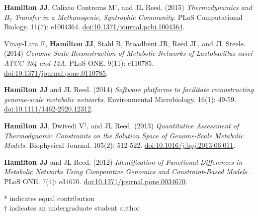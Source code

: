 \documentclass[letterpaper,11pt]{article}
\newlength{\outerbordwidth}
\newcommand{\resheading}[1]{\vspace{8pt}
  \parbox{\textwidth}{
  \setlength{\FrameSep}{\outerbordwidth}
\setlength{\fboxsep}{0pt}
\framebox[\textwidth][l]{\setlength{\fboxsep}{4pt}\fcolorbox{shadecolorB}{shadecolorB}{\textbf{\sffamily{\mbox{~}\makebox[6.262in][l]{\large #1} \vphantom{p\^{E}}}}}}
  }
  \vspace{-5pt}
}
\begin{document}
\begin{etaremune}[itemsep=-2pt]
	\item \textbf{Hamilton JJ}, Calixto Contreras M$^\dagger$, and JL Reed. (2015) \emph{Thermodynamics and H$_2$ Transfer in a Methanogenic, Syntrophic Community.} PLoS Computational Biology. 11(7): e1004364. \href{http://journals.plos.org/ploscompbiol/article?id=10.1371/journal.pcbi.1004364}{doi:10.1371/journal.pcbi.1004364}.
	\item Vinay-Lara E, \textbf{Hamilton JJ}, Stahl B, Broadbent JR, Reed JL, and JL Steele. (2014) \emph{Genome-Scale Reconstruction of Metabolic Networks of Lactobacillus casei ATCC 334 and 12A}. PLoS ONE. 9(11): e110785. \href{http://journals.plos.org/plosone/article?id=10.1371/journal.pone.0110785}{doi:10.1371/journal.pone.0110785}.
	\item \textbf{Hamilton JJ} and JL Reed. (2014) \emph{Software platforms to facilitate reconstructing genome-scale metabolic networks}. Environmental Microbiology. 16(1): 49-59. \href{http://onlinelibrary.wiley.com/doi/10.1111/1462-2920.12312/abstract}{doi:10.1111/1462-2920.12312}.
	\item \textbf{Hamilton JJ}, Dwivedi V$^\dagger$, and JL Reed. (2013) \emph{Quantitative Assessment of Thermodynamic Constraints on the Solution Space of Genome-Scale Metabolic Models.} Biophysical Journal. 105(2): 512-522. \href{http://www.cell.com/biophysj/abstract/S0006-3495%2813%2900685-1}{doi:10.1016/j.bpj.2013.06.011}.
	\item \textbf{Hamilton JJ} and JL Reed. (2012) \emph{Identification of Functional Differences in Metabolic Networks Using Comparative Genomics and Constraint-Based Models}. PLoS ONE. 7(4): e34670. \href{http://journals.plos.org/plosone/article?id=10.1371/journal.pone.0034670}{doi:10.1371/journal.pone.0034670}.
\end{etaremune}
* indicates equal contribution \\
$\dagger$ indicates an undergraduate student author

\end{document}
